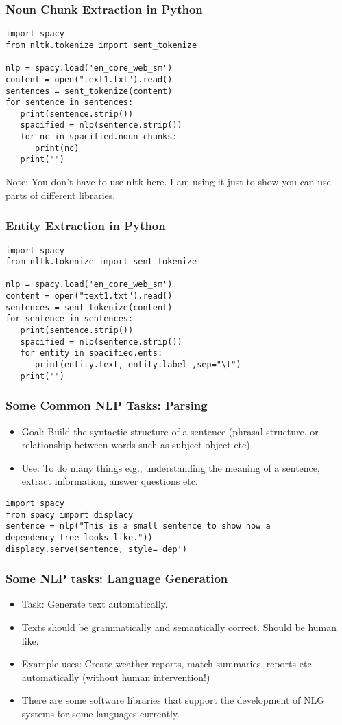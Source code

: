 \documentclass{beamer}
\begin{document}
\begin{frame}[fragile]
\frametitle{Noun Chunk Extraction in Python}
\small
\begin{verbatim}
import spacy
from nltk.tokenize import sent_tokenize

nlp = spacy.load('en_core_web_sm')
content = open("text1.txt").read()
sentences = sent_tokenize(content)
for sentence in sentences:
   print(sentence.strip())
   spacified = nlp(sentence.strip())
   for nc in spacified.noun_chunks:
      print(nc)
   print("")
\end{verbatim}
Note: You don't have to use nltk here. I am using it just to show you can use parts of different libraries. 
\end{frame}

\begin{frame}[fragile]
\frametitle{Entity Extraction in Python}
\small
\begin{verbatim}
import spacy
from nltk.tokenize import sent_tokenize

nlp = spacy.load('en_core_web_sm')
content = open("text1.txt").read()
sentences = sent_tokenize(content)
for sentence in sentences:
   print(sentence.strip())
   spacified = nlp(sentence.strip())
   for entity in spacified.ents:
      print(entity.text, entity.label_,sep="\t")
   print("")
\end{verbatim}
\end{frame}

\begin{frame}[fragile]
\frametitle{Some Common NLP Tasks: Parsing}
\begin{itemize}
\item Goal: Build the syntactic structure of a sentence (phrasal structure, or relationship between words such as subject-object etc)
\item Use: To do many things e.g., understanding the meaning of a sentence, extract information, answer questions etc.
\end{itemize} \small
\begin{verbatim}
import spacy
from spacy import displacy
sentence = nlp("This is a small sentence to show how a 
dependency tree looks like."))
displacy.serve(sentence, style='dep')
\end{verbatim}
\end{frame}

\begin{frame}
\frametitle{Some NLP tasks: Language Generation}
\begin{itemize}
\item Task: Generate text automatically.
\item Texts should be grammatically and semantically correct. Should be human like.
\item Example uses: Create weather reports, match summaries, reports etc. automatically (without human intervention!)
\item There are some software libraries that support the development of NLG systems for some languages currently.
\end{itemize}
\end{frame}
\end{document}
